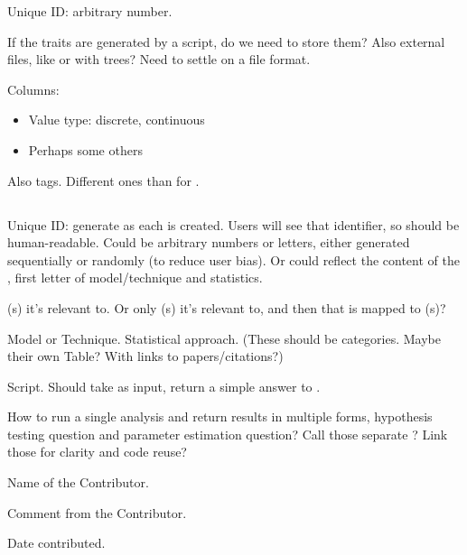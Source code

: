 Unique ID: arbitrary number.

If the traits are generated by a script, do we need to store them?
Also external files, like or with trees?
Need to settle on a file format.

Columns:
\begin{itemize}
    \item Value type: discrete, continuous
    \item Perhaps some others
\end{itemize}

Also tags.  Different ones than for \Trees.

\subsection{\Method}

Unique ID: generate as each \Method is created.
Users will see that identifier, so should be human-readable.
Could be arbitrary numbers or letters, either generated sequentially or randomly (to reduce user bias).
Or could reflect the content of the \Method, \eg first letter of model/technique and statistics.

\Task(s) it's relevant to.
Or only \Refset(s) it's relevant to, and then that is mapped to \Task(s)?

Model or Technique.
Statistical approach.
(These should be categories.  Maybe their own Table?  With links to papers/citations?)

Script.
Should take \Element as input, return a simple answer to \Task.

How to run a single analysis and return results in multiple forms, \eg hypothesis testing question and parameter estimation question?
Call those separate \Methods?  Link those \Methods for clarity and code reuse?

    \item Name of the Contributor.
    \item Comment from the Contributor.
    \item Date contributed.

\subsection{\Performance}

